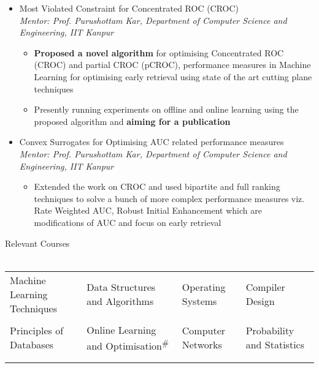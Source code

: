 \documentclass{article}
\begin{document}
\begin{itemize}[leftmargin=0.07cm]
\item[] {\large Most Violated Constraint for Concentrated ROC (CROC)}\hspace*{\fill}\\
\emph{Mentor: Prof. Purushottam Kar, Department of Computer Science and Engineering, IIT Kanpur
}	\begin{itemize}
	\item \textbf{Proposed a novel algorithm} for optimising Concentrated ROC (CROC) and partial CROC (pCROC), performance measures in Machine Learning for optimising early retrieval using state of the art cutting plane techniques
	\item Presently running experiments on offline and online learning using the proposed algorithm and \textbf{aiming for a publication}
	\end{itemize}
\end{itemize}\begin{itemize}[leftmargin=0.07cm]
\item[] {\large Convex Surrogates for Optimising AUC related performance measures}\hspace*{\fill}\\
\emph{Mentor: Prof. Purushottam Kar, Department of Computer Science and Engineering, IIT Kanpur
}	\begin{itemize}
	\item Extended the work on CROC and used bipartite and full ranking techniques to solve a bunch of more complex performance measures viz. Rate Weighted AUC, Robust Initial Enhancement which are modifications of AUC and focus on early retrieval
	\end{itemize}
\end{itemize}
{\Large Relevant Courses}\\\\
\begin{tabular}{p{4.5cm} p{5.3cm} p{3.5cm} p{4cm}}
Machine Learning Techniques & Data Structures and Algorithms & Operating Systems & Compiler Design\\\\\vspace{-0.4cm}Principles of Databases &\vspace{-0.4cm}Online Learning and Optimisation\textsuperscript{\#}  &\vspace{-0.4cm}Computer Networks & \vspace{-0.4cm}Probability and Statistics\\\\\vspace{-0.65cm}& \vspace{-0.65cm}& \vspace{-0.65cm}& \vspace{-0.65cm}{\small{\#} : \emph{Ongoing}}
\end{tabular}\vspace{-0.6cm}\\
\end{document}
